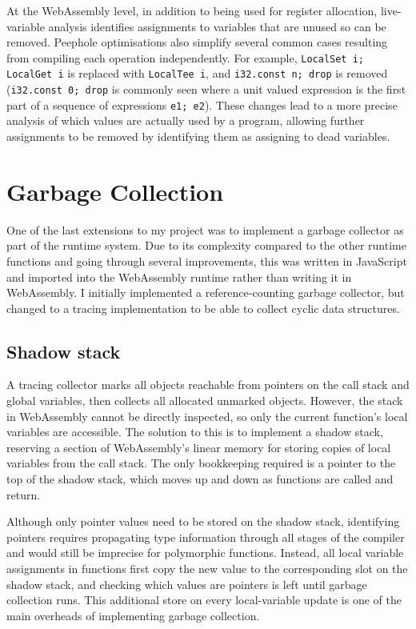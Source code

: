 At the WebAssembly level, in addition to being used for register allocation, live-variable analysis identifies assignments to variables that are unused so can be removed. Peephole optimisations also simplify several common cases resulting from compiling each operation independently. For example, \verb|LocalSet i; LocalGet i| is replaced with \verb|LocalTee i|, and \verb|i32.const n; drop| is removed (\verb|i32.const 0; drop| is commonly seen where a unit valued expression is the first part of a sequence of expressions \verb|e1; e2|). These changes lead to a more precise analysis of which values are actually used by a program, allowing further assignments to be removed by identifying them as assigning to dead variables.


\section{Garbage Collection}
One of the last extensions to my project was to implement a garbage collector as part of the runtime system. Due to its complexity compared to the other runtime functions and going through several improvements, this was written in JavaScript and imported into the WebAssembly runtime rather than writing it in WebAssembly. I initially implemented a reference-counting garbage collector, but changed to a tracing implementation to be able to collect cyclic data structures.


\subsection{Shadow stack}
A tracing collector marks all objects reachable from pointers on the call stack and global variables, then collects all allocated unmarked objects. However, the stack in WebAssembly cannot be directly inspected, so only the current function's local variables are accessible. The solution to this is to implement a shadow stack, reserving a section of WebAssembly's linear memory for storing copies of local variables from the call stack. The only bookkeeping required is a pointer to the top of the shadow stack, which moves up and down as functions are called and return.

Although only pointer values need to be stored on the shadow stack, identifying pointers requires propagating type information through all stages of the compiler and would still be imprecise for polymorphic functions. Instead, all local variable assignments in functions first copy the new value to the corresponding slot on the shadow stack, and checking which values are pointers is left until garbage collection runs. This additional store on every local-variable update is one of the main overheads of implementing garbage collection.


